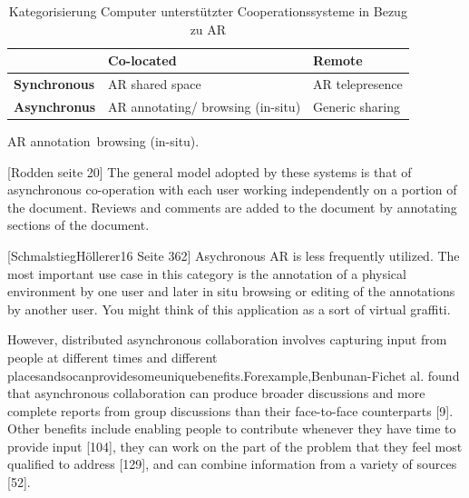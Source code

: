 \begin{table}[htbp]
\caption{Kategorisierung Computer unterstützter Cooperationssysteme in Bezug zu AR}
	\begin{center}
		\begin{tabular}{|l|ll|}
		\hline
		 & \textbf{Co-located} & \textbf{Remote}\\
		\hline
		\textbf{Synchronous} &  AR shared space & AR telepresence \\
		\textbf{Asynchronus} & AR annotating/ browsing (in-situ) & Generic sharing\\
		\hline
		\end{tabular}
	\end{center}
	\label{tab:categorycscw}
\end{table}

AR annotation\ browsing (in-situ). %

[Rodden seite 20]
The general model adopted by these systems is that of asynchronous co-operation with each user working independently on a portion of the document. Reviews and comments are added to the document by annotating sections of the document. 

[SchmalstiegHöllerer16 Seite 362] Asychronous AR is less frequently utilized. The most important use case in this category is the annotation of a physical environment by one user and later in situ browsing or editing of the annotations by another user.
You might think of this application as a sort of virtual graffiti. 



However, distributed asynchronous collaboration involves capturing input from people at different times and different placesandsocanprovidesomeuniquebenefits.Forexample,Benbunan-Fichet al. found that asynchronous collaboration can produce broader discussions and more complete reports from group discussions than their face-to-face counterparts [9]. Other benefits include enabling people to contribute whenever they have time to provide input [104], they can work on the part of the problem that they feel most qualified to address [129], and can combine information from a variety of sources [52].


